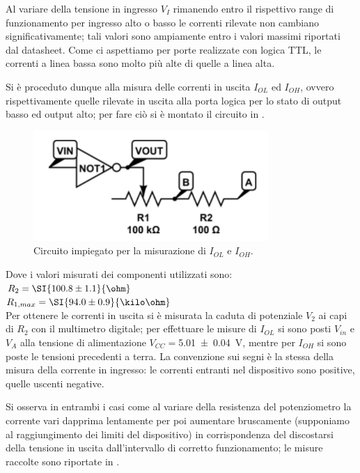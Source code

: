 	Al variare della tensione in ingresso $V_{I}$ rimanendo entro il rispettivo range di funzionamento per ingresso alto o basso le correnti rilevate non cambiano significativamente; tali valori sono ampiamente entro i valori massimi riportati dal datasheet.
	Come ci aspettiamo per porte realizzate con	logica TTL, le correnti a linea bassa sono molto più alte di quelle a linea	alta.

	Si è proceduto dunque alla misura delle correnti in uscita $I_{OL}$ ed $I_{OH}$, ovvero rispettivamente quelle rilevate in uscita alla porta logica per lo stato di output basso ed output alto; per fare ciò si è montato il circuito in .

	\begin{figure}[h]
		\centering
		\includegraphics[scale=0.75]{cir2.png}
		\caption{Circuito impiegato per la misurazione di $I_{OL}$ e $I_{OH}$. }
		\label{f:c2}
	\end{figure}

	Dove i valori misurati dei componenti utilizzati sono:\\
	$R_{2} = \SI{100.8 \pm 1.1}{\ohm}$\\
	$R_{1,max} = \SI{94.0 \pm 0.9 }{ \kilo \ohm}$\\

	Per ottenere le correnti in uscita si è misurata la caduta di potenziale  $V_2$ ai capi di $R_{2}$ con il multimetro digitale; per effettuare le misure di $I_{OL}$ si sono posti $V_{in}$ e $V_A$ alla tensione di alimentazione $V_{CC}=$\SI{5.01 \pm 0.04}{\volt}, mentre per $I_{OH}$ si sono poste le tensioni precedenti a terra. La convenzione sui segni è la
	stessa della misura della corrente in ingresso: le correnti entranti
	nel dispositivo sono positive, quelle uscenti negative.

	Si osserva in entrambi i casi come al variare della resistenza del
	potenziometro la corrente vari dapprima lentamente per poi aumentare
	bruscamente (supponiamo al raggiungimento dei limiti del dispositivo) in
	corrispondenza del discostarsi della tensione in uscita dall'intervallo di
	corretto funzionamento; le misure raccolte sono riportate in .

